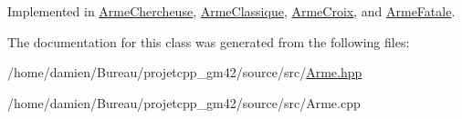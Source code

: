 Implemented in \hyperlink{classArmeChercheuse_ad3584a57b7b4fcee261b87fdd3c33806}{Arme\-Chercheuse}, \hyperlink{classArmeClassique_a0260158e5047726e694f376948dcaeca}{Arme\-Classique}, \hyperlink{classArmeCroix_a66a52523c2e6acf8f6c73fea8eb1cbcf}{Arme\-Croix}, and \hyperlink{classArmeFatale_a2e0c981f498b14ca79312d0a3ec34c70}{Arme\-Fatale}.



The documentation for this class was generated from the following files\-:\begin{DoxyCompactItemize}
\item 
/home/damien/\-Bureau/projetcpp\-\_\-gm42/source/src/\hyperlink{Arme_8hpp}{Arme.\-hpp}\item 
/home/damien/\-Bureau/projetcpp\-\_\-gm42/source/src/Arme.\-cpp\end{DoxyCompactItemize}
